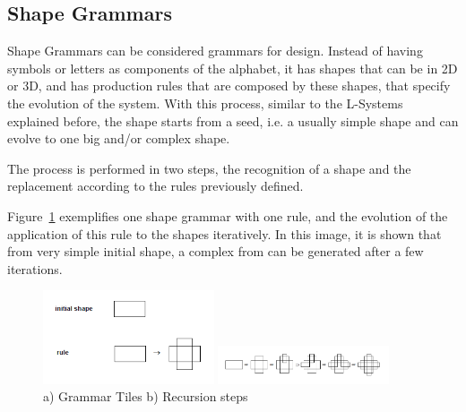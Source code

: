 
\subsection{Shape Grammars} %
\label{sub:shape_grammars}


Shape Grammars can be considered grammars for design. Instead of having symbols or letters as components of the alphabet, it has shapes that can be in 2D or 3D, and has production rules that are composed by these shapes, that specify the evolution of the system. With this process, similar to the L-Systems explained before, the shape starts from a seed, i.e. a usually simple shape and can evolve to one big and/or complex shape.

The process is performed in two steps, the recognition of a shape and the replacement according to the rules previously defined. 

Figure~\ref{fig:SGrammars} exemplifies one shape grammar with one rule, and the evolution of the application of this rule to the shapes iteratively. In this image, it is shown that from very simple initial shape, a complex from can be generated after a few iterations.

\begin{figure}
        \centering
			\includegraphics[width=0.45\textwidth]{images/Theory/Shape_Grammars/Grammar.png}
        
			\includegraphics[width=0.45\textwidth]{images/Theory/Shape_Grammars/Recursion.png}
        \caption{a) Grammar Tiles b) Recursion steps}
        \label{fig:SGrammars}
\end{figure}

